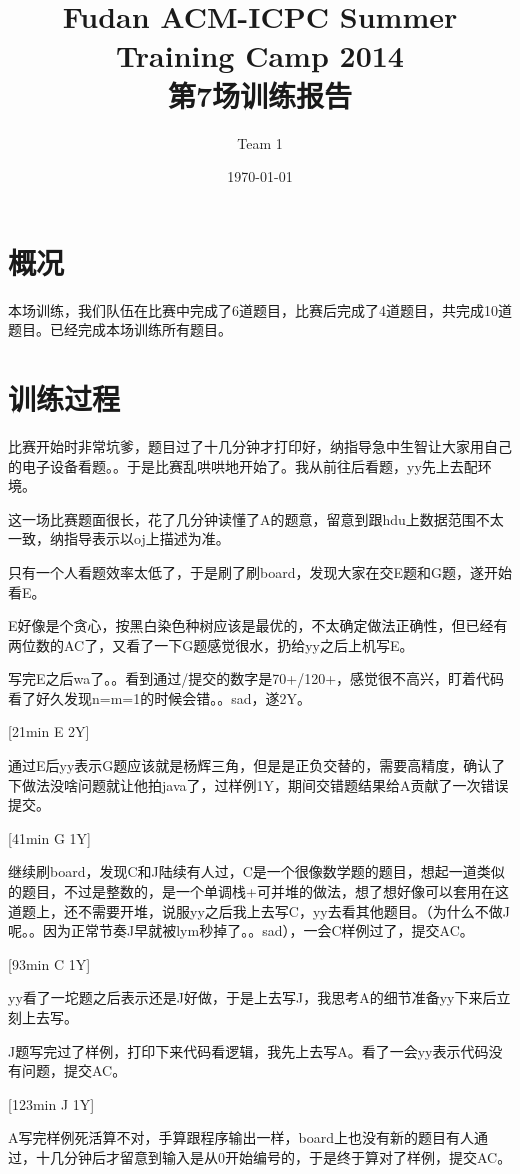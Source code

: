 \documentclass[a4paper, 11pt, nofonts, nocap, fancyhdr]{ctexart}
\title{Fudan ACM-ICPC Summer Training Camp 2014\\第7场训练报告}
\author{Team 1}
\date{\today}
\begin{document}
\maketitle

\section{概况}

本场训练，我们队伍在比赛中完成了6道题目，比赛后完成了4道题目，共完成10道题目。已经完成本场训练所有题目。

\section{训练过程}

比赛开始时非常坑爹，题目过了十几分钟才打印好，纳指导急中生智让大家用自己的电子设备看题。。于是比赛乱哄哄地开始了。我从前往后看题，yy先上去配环境。

这一场比赛题面很长，花了几分钟读懂了A的题意，留意到跟hdu上数据范围不太一致，纳指导表示以oj上描述为准。

只有一个人看题效率太低了，于是刷了刷board，发现大家在交E题和G题，遂开始看E。

E好像是个贪心，按黑白染色种树应该是最优的，不太确定做法正确性，但已经有两位数的AC了，又看了一下G题感觉很水，扔给yy之后上机写E。\

写完E之后wa了。。看到通过/提交的数字是70+/120+，感觉很不高兴，盯着代码看了好久发现n=m=1的时候会错。。sad，遂2Y。

[21min E 2Y]

通过E后yy表示G题应该就是杨辉三角，但是是正负交替的，需要高精度，确认了下做法没啥问题就让他拍java了，过样例1Y，期间交错题结果给A贡献了一次错误提交。

[41min G 1Y]

继续刷board，发现C和J陆续有人过，C是一个很像数学题的题目，想起一道类似的题目，不过是整数的，是一个单调栈+可并堆的做法，想了想好像可以套用在这道题上，还不需要开堆，说服yy之后我上去写C，yy去看其他题目。（为什么不做J呢。。因为正常节奏J早就被lym秒掉了。。sad），一会C样例过了，提交AC。

[93min C 1Y]

yy看了一坨题之后表示还是J好做，于是上去写J，我思考A的细节准备yy下来后立刻上去写。

J题写完过了样例，打印下来代码看逻辑，我先上去写A。看了一会yy表示代码没有问题，提交AC。

[123min J 1Y]

A写完样例死活算不对，手算跟程序输出一样，board上也没有新的题目有人通过，十几分钟后才留意到输入是从0开始编号的，于是终于算对了样例，提交AC。
\end{document}
